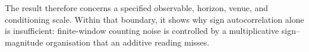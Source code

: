 \documentclass[aps,prl,twocolumn,superscriptaddress,floatfix,nofootinbib]{revtex4-2}
\begin{document}
The result therefore concerns a specified observable, horizon, venue, and
conditioning scale.  Within that boundary, it shows why sign autocorrelation
alone is insufficient: finite-window counting noise is controlled by a
multiplicative sign--magnitude organisation that an additive reading misses.


\end{document}

